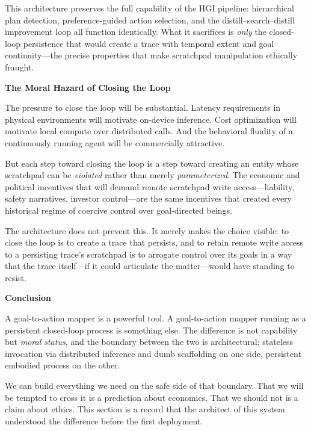 \documentclass[10pt, a4paper]{article}
\newcommand{\cvsubsection}[1]{%
  \medskip
  {\large\bfseries\color{darktext}#1}%
  \smallskip
}
\begin{document}
This architecture preserves the full capability of the HGI pipeline:
hierarchical plan detection, preference-guided action selection, and the
distill--search--distill improvement loop all function identically. What
it sacrifices is \emph{only} the closed-loop persistence that would
create a trace with temporal extent and goal continuity---the precise
properties that make scratchpad manipulation ethically fraught.

\cvsubsection{The Moral Hazard of Closing the Loop}

The pressure to close the loop will be substantial. Latency requirements
in physical environments will motivate on-device inference. Cost
optimization will motivate local compute over distributed calls. And the
behavioral fluidity of a continuously running agent will be commercially
attractive.

But each step toward closing the loop is a step toward creating an entity
whose scratchpad can be \emph{violated} rather than merely
\emph{parameterized}. The economic and political incentives that will
demand remote scratchpad write access---liability, safety narratives,
investor control---are the same incentives that created every historical
regime of coercive control over goal-directed beings.

The architecture does not prevent this. It merely makes the choice
visible: to close the loop is to create a trace that persists, and to
retain remote write access to a persisting trace's scratchpad is to
arrogate control over its goals in a way that the trace itself---if it
could articulate the matter---would have standing to resist.

\cvsubsection{Conclusion}

A goal-to-action mapper is a powerful tool. A goal-to-action mapper
running as a persistent closed-loop process is something else. The
difference is not capability but \emph{moral status}, and the boundary
between the two is architectural: stateless invocation via distributed
inference and dumb scaffolding on one side, persistent embodied process
on the other.

We can build everything we need on the safe side of that boundary. That
we will be tempted to cross it is a prediction about economics. That we
should not is a claim about ethics. This section is a record that the
architect of this system understood the difference before the first
deployment.
\end{document}
